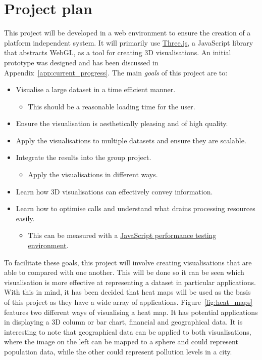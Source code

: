 \documentclass[
	fontsize=11pt
	headlines=2,
	footlines=2,
	parskip=half
]{scrartcl}
\begin{document}
	\section{Project plan} {
	\label{sec:project_plan}
		
		This project will be developed in a web environment to ensure the creation of a platform independent system. It will primarily use \href{http://threejs.org/}{Three.js}, a JavaScript library that abstracts WebGL, as a tool for creating 3D visualisations. An initial prototype was designed and has been discussed in Appendix~\ref{app:current_progress}. The main \emph{goals} of this project are to:
		
		\begin{itemize}
			\item Visualise a large dataset in a time efficient manner.
			\begin{itemize}
				\item This should be a reasonable loading time for the user.
			\end{itemize}
			\item Ensure the visualisation is aesthetically pleasing and of high quality.
			\item Apply the visualisations to multiple datasets and ensure they are scalable. 
			\item Integrate the results into the group project.
			\begin{itemize}
				\item Apply the visualisations in different ways.
			\end{itemize}
			\item Learn how 3D visualisations can effectively convey information.
			\item Learn how to optimise calls and understand what drains processing resources easily.
			\begin{itemize}
				\item This can be measured with a \href{http://jsperf.com/}{JavaScript performance testing environment}.
			\end{itemize}
		\end{itemize}
		
		To facilitate these goals, this project will involve creating visualisations that are able to compared with one another. This will be done so it can be seen which visualisation is more effective at representing a dataset in particular applications. With this in mind, it has been decided that heat maps will be used as the basis of this project as they have a wide array of applications. Figure~\ref{fig:heat_maps} features two different ways of visualising a heat map. It has potential applications in displaying a 3D column or bar chart, financial and geographical data. It is interesting to note that geographical data can be applied to both visualisations, where the image on the left can be mapped to a sphere and could represent population data, while the other could represent pollution levels in a city.
		
}
\end{document}
